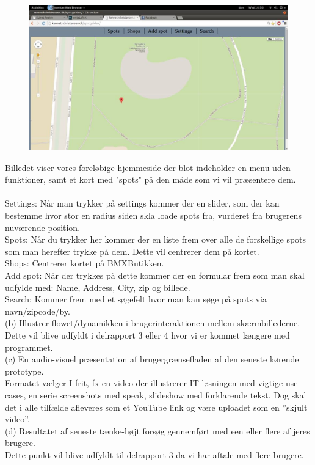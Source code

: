 \documentclass[12pt]{article}
\begin{document}
\begin{figure}[h]
\includegraphics[scale = 0.3]{screen1}
\end{figure}

Billedet viser vores foreløbige hjemmeside der blot indeholder en menu uden funktioner, samt et kort med "spots" på den måde som vi vil præsentere dem. \\ \\
Settings: Når man trykker på settings kommer der en slider, som der kan bestemme hvor stor en radius siden skla loade spots fra, vurderet fra brugerens nuværende position.\\
Spots: Når du trykker her kommer der en liste frem over alle de forskellige spots som man herefter trykke på dem. Dette vil centrerer dem på kortet.\\
Shops: Centrerer kortet på BMXButikken.\\
Add spot: Når der trykkes på dette kommer der en formular frem som man skal udfylde med: Name, Address, City, zip og billede.\\
Search: Kommer frem med et søgefelt hvor man kan søge på spots via navn/zipcode/by.\\

(b) Illustrer flowet/dynamikken i brugerinteraktionen mellem skærmbillederne.\\
Dette vil blive udfyldt i delrapport 3 eller 4 hvor vi er kommet længere med programmet.\\
(c) En audio-visuel præsentation af brugergrænsefladen af den seneste kørende prototype.\\
Formatet vælger I frit, fx en video der illustrerer IT-løsningen med vigtige use cases, en serie
screenshots med speak, slideshow med forklarende tekst. Dog skal det i alle tilfælde afleveres som
et YouTube link og være uploadet som en ”skjult video”.\\
(d) Resultatet af seneste tænke-højt forsøg gennemført med een eller flere af jeres brugere.\\
Dette punkt vil blive udfyldt til delrapport 3 da vi har aftale med flere brugere.\\
\end{document}
